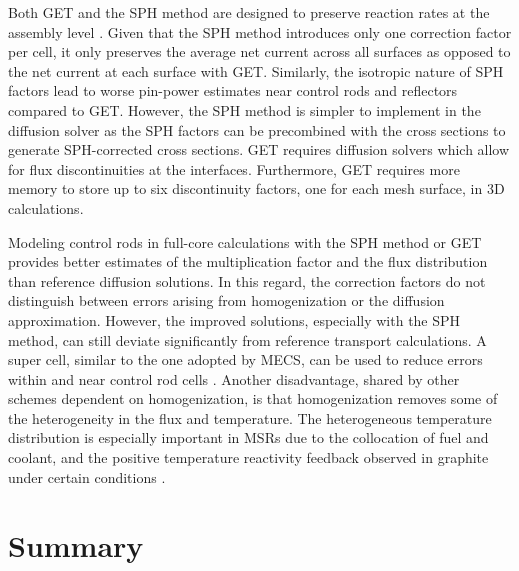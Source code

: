 Both \gls{GET} and the \gls{SPH} method are designed to preserve reaction rates at the assembly
level \cite{yamamoto_cell_2004}. Given that the \gls{SPH} method introduces only one correction
factor per cell, it only preserves the average net current across all surfaces as opposed
to the net current at each surface with \gls{GET}. Similarly, the isotropic nature of \gls{SPH}
factors lead to worse pin-power estimates near control rods and reflectors compared to \gls{GET}.
However, the \gls{SPH} method is simpler to implement in the diffusion solver as the \gls{SPH}
factors can be precombined with the cross sections to generate \gls{SPH}-corrected cross sections.
\gls{GET} requires diffusion solvers which allow for flux discontinuities at the interfaces.
Furthermore, \gls{GET} requires more memory to store up to six discontinuity factors, one for each
mesh surface, in 3D calculations.

Modeling control rods in full-core calculations with the \gls{SPH} method or \gls{GET} provides
better estimates of the multiplication factor and the flux distribution than reference diffusion
solutions. In this regard, the correction factors do not distinguish between errors arising from
homogenization or the diffusion approximation. However, the improved solutions, especially with the
\gls{SPH} method, can still deviate significantly from reference transport calculations. A super
cell, similar to the one adopted by \gls{MECS}, can be used to reduce errors within and near
control rod cells \cite{ortensi_newton_2018}. Another disadvantage, shared by other schemes
dependent on homogenization, is that homogenization removes some of the heterogeneity in the flux
and temperature. The heterogeneous temperature distribution is especially important in \glspl{MSR}
due to the collocation of fuel and coolant, and the positive temperature reactivity feedback
observed in graphite under certain conditions \cite{mathieu_thorium_2006}.

\section{Summary}

